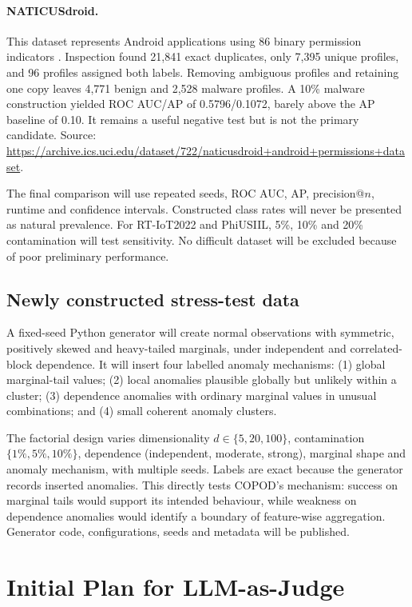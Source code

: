 \documentclass[11pt,a4paper,twocolumn]{article}
\begin{document}
\paragraph{NATICUSdroid.}
This dataset represents Android applications using 86 binary permission indicators \citep{mathur2021}. Inspection found 21,841 exact duplicates, only 7,395 unique profiles, and 96 profiles assigned both labels. Removing ambiguous profiles and retaining one copy leaves 4,771 benign and 2,528 malware profiles. A 10\% malware construction yielded ROC AUC/AP of 0.5796/0.1072, barely above the AP baseline of 0.10. It remains a useful negative test but is not the primary candidate. Source: \url{https://archive.ics.uci.edu/dataset/722/naticusdroid+android+permissions+dataset}.

The final comparison will use repeated seeds, ROC AUC, AP, precision@$n$, runtime and confidence intervals. Constructed class rates will never be presented as natural prevalence. For RT-IoT2022 and PhiUSIIL, 5\%, 10\% and 20\% contamination will test sensitivity. No difficult dataset will be excluded because of poor preliminary performance.

\subsection{Newly constructed stress-test data}

A fixed-seed Python generator will create normal observations with symmetric, positively skewed and heavy-tailed marginals, under independent and correlated-block dependence. It will insert four labelled anomaly mechanisms: (1) global marginal-tail values; (2) local anomalies plausible globally but unlikely within a cluster; (3) dependence anomalies with ordinary marginal values in unusual combinations; and (4) small coherent anomaly clusters.

The factorial design varies dimensionality $d\in\{5,20,100\}$, contamination $\{1\%,5\%,10\%\}$, dependence (independent, moderate, strong), marginal shape and anomaly mechanism, with multiple seeds. Labels are exact because the generator records inserted anomalies. This directly tests COPOD's mechanism: success on marginal tails would support its intended behaviour, while weakness on dependence anomalies would identify a boundary of feature-wise aggregation. Generator code, configurations, seeds and metadata will be published.

\section{Initial Plan for LLM-as-Judge}
\end{document}
